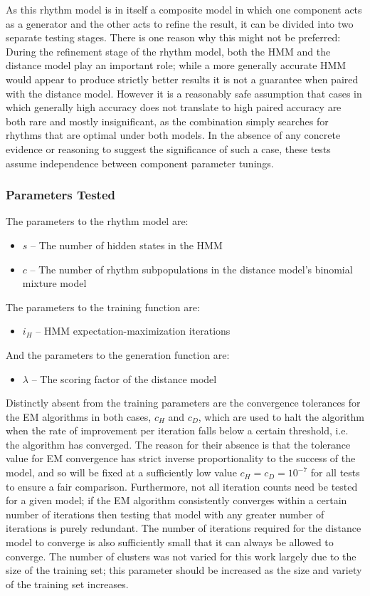 \documentclass[ author={Stephen Livermore-Tozer},
				supervisor={Dr. Peter Flach},
				degree={MEng},
				title={Algorithmic Co-composition Using Machine Learning},
				subtitle={},
				type={research},
				year={2016} ]{dissertation}
\begin{document}
	As this rhythm model is in itself a composite model in which one component acts as a generator and the other acts to refine the result, it can be divided into two separate testing stages. There is one reason why this might not be preferred: During the refinement stage of the rhythm model, both the HMM and the distance model play an important role; while a more generally accurate HMM would appear to produce strictly better results it is not a guarantee when paired with the distance model. However it is a reasonably safe assumption that cases in which generally high accuracy does not translate to high paired accuracy are both rare and mostly insignificant, as the combination simply searches for rhythms that are optimal under both models. In the absence of any concrete evidence or reasoning to suggest the significance of such a case, these tests assume independence between component parameter tunings.
	
	\subsubsection{Parameters Tested}
	
	The parameters to the rhythm model are:
	\begin{itemize}
		\item $s$ -- The number of hidden states in the HMM
		\item $c$ -- The number of rhythm subpopulations in the distance model's binomial mixture model
	\end{itemize}
	The parameters to the training function are:
	\begin{itemize}
		\item $i_H$ -- HMM expectation-maximization iterations
	\end{itemize}
	And the parameters to the generation function are:
	\begin{itemize}
		\item $\lambda$ -- The scoring factor of the distance model
	\end{itemize}
	
	Distinctly absent from the training parameters are the convergence tolerances for the EM algorithms in both cases, $c_H$ and $c_D$, which are used to halt the algorithm when the rate of improvement per iteration falls below a certain threshold, i.e. the algorithm has converged. The reason for their absence is that the tolerance value for EM convergence has strict inverse proportionality to the success of the model, and so will be fixed at a sufficiently low value $c_H = c_D = 10^{-7}$ for all tests to ensure a fair comparison. Furthermore, not all iteration counts need be tested for a given model; if the EM algorithm consistently converges within a certain number of iterations then testing that model with any greater number of iterations is purely redundant. The number of iterations required for the distance model to converge is also sufficiently small that it can always be allowed to converge. The number of clusters was not varied for this work largely due to the size of the training set; this parameter should be increased as the size and variety of the training set increases. 
	
\end{document}
